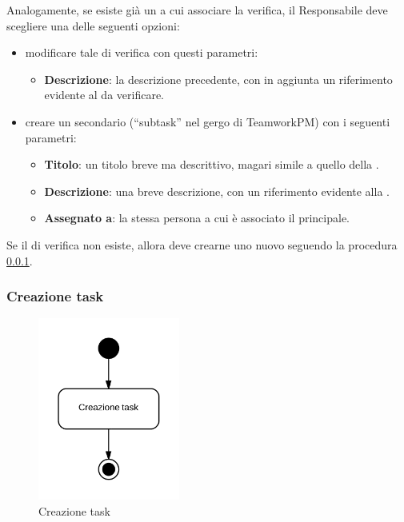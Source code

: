 Analogamente, se esiste già un  a cui associare la verifica, il Responsabile deve scegliere una delle seguenti opzioni:
\begin{itemize}
 \item modificare tale  di verifica con questi parametri:
	\begin{itemize}
		\item \textbf{Descrizione}: la descrizione precedente, con in aggiunta un riferimento evidente al  da verificare.
	\end{itemize}
 \item creare un  secondario (``subtask'' nel gergo di TeamworkPM) con i seguenti parametri:
	\begin{itemize}
		\item \textbf{Titolo}: un titolo breve ma descrittivo, magari simile a quello della .
		\item \textbf{Descrizione}: una breve descrizione, con un riferimento evidente alla .
		\item \textbf{Assegnato a}: la stessa persona a cui è associato il  principale.
	\end{itemize}
\end{itemize}

Se il  di verifica non esiste, allora deve crearne uno nuovo seguendo la procedura \ref{creazionetask}.

\subsubsection{Creazione task}
\label{creazionetask}

\begin{figure}[H]
    \centering
    \includegraphics[height=6cm]{uml-processi/creazione_task.png}
    \caption{Creazione task}
\end{figure}

